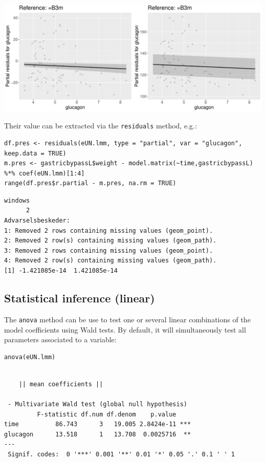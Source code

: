 \documentclass[12pt]{article}
\begin{document}
\begin{center}
\includegraphics[width=\textwidth]{./figures/fit-pres.pdf}
\end{center}

Their value can be extracted via the \texttt{residuals} method, e.g.:
\lstset{language=r,label= ,caption= ,captionpos=b,numbers=none}
\begin{lstlisting}
df.pres <- residuals(eUN.lmm, type = "partial", var = "glucagon", keep.data = TRUE)
m.pres <- gastricbypassL$weight - model.matrix(~time,gastricbypassL) %*% coef(eUN.lmm)[1:4]
range(df.pres$r.partial - m.pres, na.rm = TRUE)
\end{lstlisting}

\begin{verbatim}
windows 
      2 
Advarselsbeskeder:
1: Removed 2 rows containing missing values (geom_point). 
2: Removed 2 row(s) containing missing values (geom_path). 
3: Removed 2 rows containing missing values (geom_point). 
4: Removed 2 row(s) containing missing values (geom_path).
[1] -1.421085e-14  1.421085e-14
\end{verbatim}


\clearpage

\subsection{Statistical inference (linear)}
\label{sec:org3cf03e8}

The \texttt{anova} method can be use to test one or several linear
combinations of the model coefficients using Wald tests. By default,
it will simultaneously test all parameters associated to a variable:
\lstset{language=r,label= ,caption= ,captionpos=b,numbers=none}
\begin{lstlisting}
anova(eUN.lmm)
\end{lstlisting}

\begin{verbatim}

	|| mean coefficients || 

 - Multivariate Wald test (global null hypothesis)
         F-statistic df.num df.denom    p.value    
time          86.743      3   19.005 2.8424e-11 ***
glucagon      13.518      1   13.708  0.0025716  **
---
 Signif. codes:  0 '***' 0.001 '**' 0.01 '*' 0.05 '.' 0.1 ' ' 1
\end{verbatim}
\end{document}
